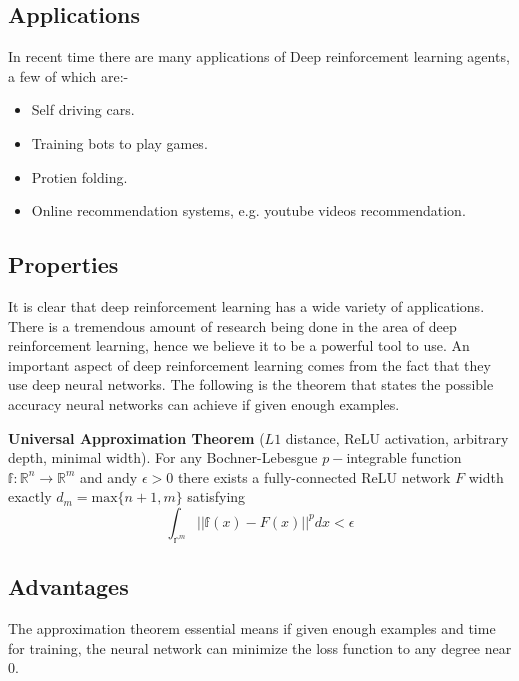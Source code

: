 \subsection{Applications}
In recent time there are many applications of Deep reinforcement learning agents, a few of which are:-
\begin{itemize}
    \item Self driving cars.
    \item Training bots to play games.
    \item Protien folding.
    \item Online recommendation systems, e.g. youtube videos recommendation.
\end{itemize}
\subsection{Properties}
It is clear that deep reinforcement learning has a wide variety of applications. There is a tremendous amount of research being done in the area of deep reinforcement learning, hence we believe it to be a powerful tool to use. An important aspect of deep reinforcement learning comes from the fact that they use deep neural networks. The following is the theorem that states the possible accuracy neural networks can achieve if given enough examples.

\par \textbf{Universal Approximation Theorem} ($L1$ distance, ReLU activation, arbitrary depth, minimal width). For any Bochner-Lebesgue $p-$integrable function $\mathbb{f}:\mathbb{R}^{n}\rightarrow\mathbb{R}^{m}$ and andy $\epsilon>0$ there exists a fully-connected ReLU network $F$ width exactly $d_{m}=\text{max}\{n+1,m\}$ satisfying 
$$\int_{\mathbb{r}^{m}}||\mathbb{f}(x)-F(x)||^{p}dx<\epsilon$$


\subsection{Advantages}
The approximation theorem essential means if given enough examples and time for training, the neural network can minimize the loss function to any degree near $0$. 


